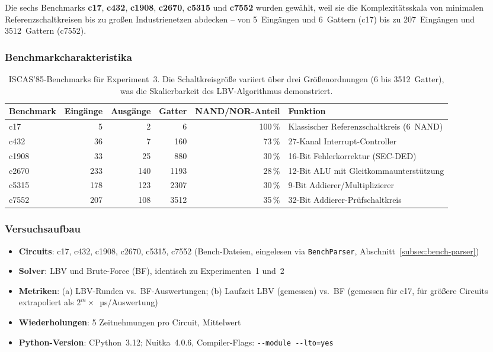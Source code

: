 ﻿\documentclass[a4paper,12pt]{article}
\theoremstyle{definition}
\begin{document}
Die sechs Benchmarks \textbf{c17}, \textbf{c432}, \textbf{c1908},
\textbf{c2670}, \textbf{c5315} und \textbf{c7552} wurden gewählt, weil sie
die Komplexitätsskala von minimalen Referenzschaltkreisen bis zu
großen Industrienetzen abdecken -- von 5~Eingängen und 6~Gattern (c17)
bis zu 207~Eingängen und 3512~Gattern (c7552).

\subsubsection{Benchmarkcharakteristika}

\begin{table}
  \centering
  \begin{tabular}{lrrrrl}
    \toprule
    \textbf{Benchmark} & \textbf{Eingänge} & \textbf{Ausgänge}
      & \textbf{Gatter} & \textbf{NAND/NOR-Anteil} & \textbf{Funktion} \\
    \midrule
    c17   &   5 &  2 &    6 & 100\,\% & Klassischer Referenzschaltkreis (6~NAND) \\
    c432  &  36 &  7 &  160 & ~73\,\% & 27-Kanal Interrupt-Controller \\
    c1908 &  33 & 25 &  880 & ~30\,\% & 16-Bit Fehlerkorrektur (SEC-DED) \\
    c2670 & 233 & 140 & 1193 & ~28\,\% & 12-Bit ALU mit Gleitkommaunterstützung \\
    c5315 & 178 & 123 & 2307 & ~30\,\% & 9-Bit Addierer/Multiplizierer \\
    c7552 & 207 & 108 & 3512 & ~35\,\% & 32-Bit Addierer-Prüfschaltkreis \\
    \bottomrule
  \end{tabular}
  \caption{ISCAS'85-Benchmarks für Experiment~3.  Die Schaltkreisgröße
           variiert über drei Größenordnungen (6 bis 3512~Gatter),
           was die Skalierbarkeit des LBV-Algorithmus demonstriert.}
  \label{tab:iscas-benchmarks}
\end{table}

\subsubsection{Versuchsaufbau}

\begin{itemize}
  \item \textbf{Circuits}: c17, c432, c1908, c2670, c5315, c7552 (Bench-Dateien,
    eingelesen via \texttt{BenchParser}, Abschnitt~\ref{subsec:bench-parser})
  \item \textbf{Solver}: LBV und Brute-Force (BF), identisch zu
    Experimenten~1 und~2
  \item \textbf{Metriken}: (a) LBV-Runden vs.\ BF-Auswertungen;
    (b) Laufzeit LBV (gemessen) vs.\ BF (gemessen für c17,
    für größere Circuits extrapoliert als $2^m \times$\, µs/Auswertung)
  \item \textbf{Wiederholungen}: 5 Zeitnehmungen pro Circuit, Mittelwert
  \item \textbf{Python-Version}: CPython~3.12; Nuitka~4.0.6,
    Compiler-Flags: \texttt{-{}-module -{}-lto=yes}
\end{itemize}
\end{document}
